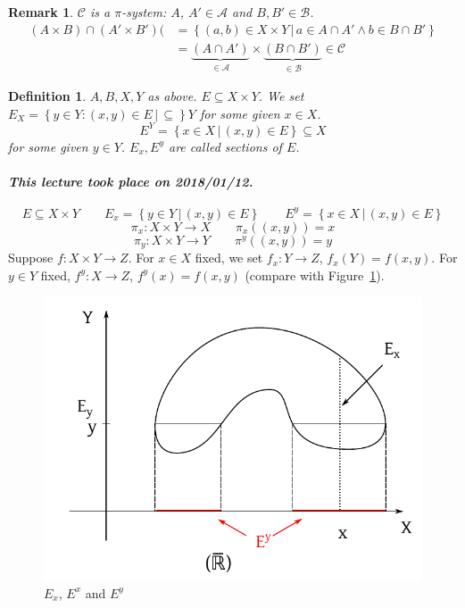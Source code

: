 \documentclass{article}
\newtheorem{definition}{Definition}  \numberwithin{definition}{section}
\newtheorem{remark}{Remark}  \numberwithin{remark}{section}
\newcommand{\setdef}[2]{\left\{\left.#1\,\right|\,#2\right\}}
\newcommand{\dateref}[1]{\paragraph{\textit{This lecture took place on #1.}}}
\begin{document}
\begin{remark}
  $\mathcal C$ is a $\pi$-system: $A$, $A' \in \mathcal A$ and $B, B' \in \mathcal B$.
  \begin{align*}
    (A \times B) \cap (A' \times B')(
          &= \setdef{(a, b) \in X \times Y}{a \in A \cap A' \land b \in B \cap B'} \\
          &= \underbrace{(A \cap A')}_{\in \mathcal A} \times \underbrace{(B \cap B')}_{\in \mathcal B} \in \mathcal C
  \end{align*}
\end{remark}
\begin{definition}
  $A, B, X, Y$ as above.
  $E \subseteq X \times Y$. We set $E_X = \setdef{y \in Y: (x, y) \in E} \subseteq Y$ for some given $x \in X$.
  \[ E^Y = \setdef{x \in X}{(x, y) \in E} \subseteq X \]
  for some given $y \in Y$.
  $E_x, E^y$ are called \emph{sections of $E$}.
\end{definition}

\dateref{2018/01/12}

\[ E \subseteq X \times Y \qquad E_x = \setdef{y \in Y}{(x, y) \in E} \qquad E^y = \setdef{x \in X}{(x, y) \in E} \]
\[ \pi_x: X \times Y \to X \qquad \pi_x((x, y)) = x \]
\[ \pi_y: X \times Y \to Y \qquad \pi^y((x, y)) = y \]
Suppose $f: X \times Y \to Z$. For $x \in X$ fixed, we set $f_x: Y \to Z$, $f_x(Y) = f(x, y)$.
For $y \in Y$ fixed, $f^y: X \to Z$, $f^y(x) = f(x, y)$ (compare with Figure~\ref{img:E}).

\begin{figure}[!h]
  \begin{center}
    \includegraphics{img/21_Ex_Ey.pdf}
    \caption{$E_x$, $E^x$ and $E^y$}
    \label{img:E}
  \end{center}
\end{figure}
\end{document}
